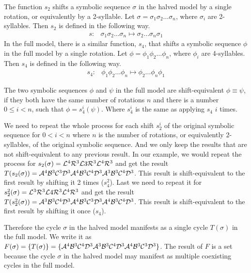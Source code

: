 \begin{definition}
    The function $s_2$ shifts a symbolic sequence $\sigma$ in the halved model by a single rotation, or equivalently by a 2-syllable.
    Let $\sigma = \sigma_1\sigma_2 \dots \sigma_n$, where $\sigma_i$ are 2-syllables.
    Then $s_2$ is defined in the following way.
    \begin{align}
        s: & \sigma_1\sigma_2 \dots \sigma_n \mapsto \sigma_2 \dots \sigma_n\sigma_1
    \end{align}
    In the full model, there is a similar function, $s_4$, that shifts a symbolic sequence $\phi$ in the full model by a single rotation.
    Let $\phi = \phi_1\phi_2 \dots \phi_n$, where $\phi_i$ are 4-syllables.
    Then $s_4$ is defined in the following way.
    \begin{align}
        s_4: & \phi_1\phi_2 \dots \phi_n \mapsto \phi_2 \dots \phi_n\phi_1
    \end{align}
\end{definition}

\begin{definition}
    The two symbolic sequences $\phi$ and $\psi$ in the full model are shift-equivalent $\phi \equiv \psi$,
    if they both have the same number of rotations $n$
    and there is a number $0 \leq i < n$, such that $\phi = s_4^i(\psi)$.
    Where $s_4^i$ is the same as applying $s_4$ $i$ times.
\end{definition}

We need to repeat the whole process for each shift $s_2^i$ of the original symbolic sequence for $0 < i < n$ where $n$ is the number of rotations, or equivalently 2-syllables, of the original symbolic sequence.
And we only keep the results that are not shift-equivalent to any previous result.
In our example, we would repeat the process for $s_2(\sigma) = \mathcal{L}^4\mathcal{R}^3\mathcal{L}3\mathcal{R}^3\mathcal{L}^4\mathcal{R}^3$ and get the result $T(s_2(\sigma)) = \mathcal{A}^4\mathcal{B}^3\mathcal{C}^3\mathcal{D}^3\mathcal{A}^4\mathcal{B}^3\mathcal{C}^4\mathcal{D}^3\mathcal{A}^3\mathcal{B}^3\mathcal{C}^4\mathcal{D}^3$.
This result is shift-equivalent to the first result by shifting it 2 times ($s_4^2$).
Last we need to repeat it for $s_2^2(\sigma) = \mathcal{L}^3\mathcal{R}^3\mathcal{L}4\mathcal{R}^3\mathcal{L}^4\mathcal{R}^3$ and get the result $T(s_2^2(\sigma)) = \mathcal{A}^3\mathcal{B}^3\mathcal{C}^4\mathcal{D}^3\mathcal{A}^4\mathcal{B}^3\mathcal{C}^3\mathcal{D}^3\mathcal{A}^4\mathcal{B}^3\mathcal{C}^4\mathcal{D}^3$.
This result is shift-equivalent to the first result by shifting it once ($s_4$).

Therefore the cycle $\sigma$ in the halved model manifests as a single cycle $T(\sigma)$ in the full model.
We write it as $F(\sigma) = \{T(\sigma)\} = \{\mathcal{A}^4\mathcal{B}^3\mathcal{C}^4\mathcal{D}^3\mathcal{A}^3\mathcal{B}^3\mathcal{C}^4\mathcal{D}^3\mathcal{A}^4\mathcal{B}^3\mathcal{C}^3\mathcal{D}^3\}$.
The result of $F$ is a set because the cycle $\sigma$ in the halved model may manifest as multiple coexisting cycles in the full model.

